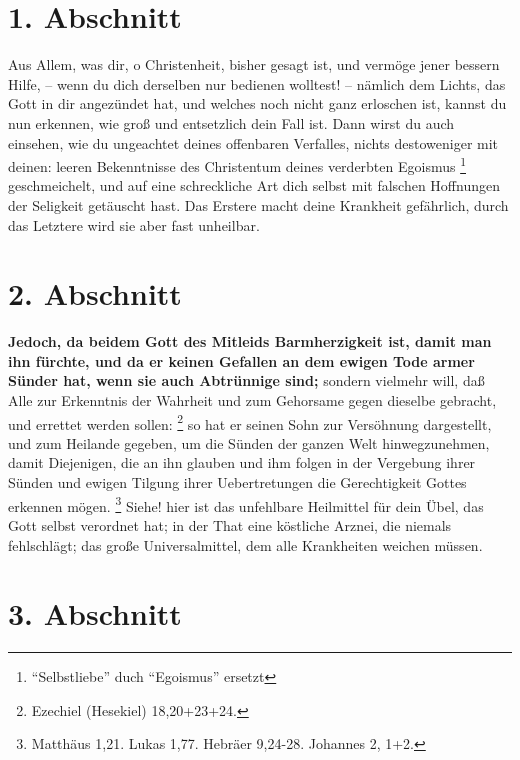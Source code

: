 \section{1. Abschnitt}  \label{kap2_ab1}

Aus Allem, was dir, o Christenheit, bisher gesagt ist, und vermöge jener bessern
Hilfe, -- wenn du dich derselben nur bedienen wolltest! -- nämlich dem Lichts,
das Gott in dir angezündet hat, und welches noch nicht ganz erloschen ist,
kannst du nun erkennen, wie groß und entsetzlich dein Fall ist. Dann wirst du
auch einsehen, wie du ungeachtet deines offenbaren Verfalles, nichts
destoweniger mit deinen: leeren Bekenntnisse des Christentum deines verderbten
Egoismus
\footnote{"`Selbstliebe"' duch "`Egoismus"' ersetzt} geschmeichelt,
und auf eine schreckliche Art dich selbst mit
falschen Hoffnungen der Seligkeit getäuscht hast. Das Erstere macht deine
Krankheit gefährlich, durch das Letztere wird sie aber fast unheilbar.

\section{2. Abschnitt}  \label{kap2_ab2}

\textbf{Jedoch, da beidem Gott des Mitleids Barmherzigkeit ist, damit man ihn
fürchte, und da er keinen Gefallen an dem ewigen Tode  armer
Sünder hat, wenn
sie auch Abtrünnige sind;} sondern vielmehr will, daß Alle zur Erkenntnis der
Wahrheit und zum Gehorsame gegen dieselbe gebracht, und errettet werden
sollen:
\footnote{Ezechiel (Hesekiel) 18,20+23+24.}
 so hat er seinen Sohn zur
Versöhnung
dargestellt, und zum Heilande gegeben, um die Sünden der ganzen Welt
hinwegzunehmen, damit Diejenigen, die an ihn glauben und ihm folgen in der
Vergebung ihrer Sünden und ewigen Tilgung ihrer Uebertretungen die
Gerechtigkeit Gottes erkennen mögen.
\footnote{Matthäus 1,21. Lukas 1,77. Hebräer 9,24-28. Johannes 2, 1+2.}
Siehe! hier ist das unfehlbare Heilmittel für dein
Übel, das Gott selbst verordnet hat; in der That eine köstliche Arznei, die
niemals fehlschlägt; das große Universalmittel, dem alle Krankheiten weichen
müssen.

\section{3. Abschnitt}  \label{kap2_ab3}

